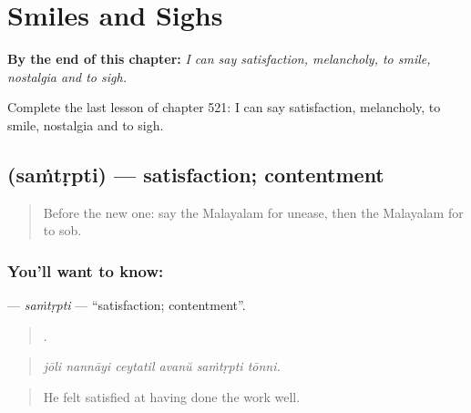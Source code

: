 
\chapter{Smiles and Sighs}
\label{ch:ml-smiles-and-sighs}

\begin{chapteropening}
\textbf{By the end of this chapter:} \emph{I can say satisfaction, melancholy, to smile, nostalgia and to sigh.}

Complete the last lesson of chapter 521: I can say satisfaction, melancholy, to smile, nostalgia and to sigh.
\end{chapteropening}

\section[\texorpdfstring{\ml{സംതൃപ്തി} (saṁtṛpti)}{സംതൃപ്തി (saṁtṛpti)}]{ (saṁtṛpti) — satisfaction; contentment}

\label{lesson:ML-C521-samtrpti}



\begin{quote}
Before the new one: say the Malayalam for unease, then the Malayalam for to sob.
\end{quote}

\subsection*{You'll want to know: }
\textbf{} — \emph{saṁtṛpti} — \textquotedblleft{}satisfaction; contentment\textquotedblright{}.

\begin{quote}
     .
\end{quote}

\begin{quote}
\emph{jōli nannāyi ceytatil avanŭ saṁtṛpti tōnni.}
\end{quote}

\begin{quote}
He felt satisfied at having done the work well.
\end{quote}

